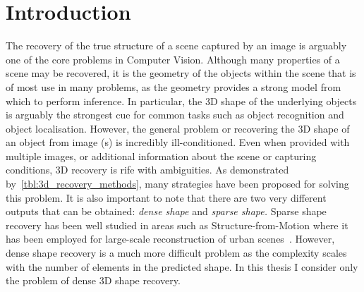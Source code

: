 \chapter{Introduction}\label{ch:intro}
The recovery of the true structure of a scene captured by an image is 
arguably one of the core problems in Computer Vision. Although many properties
of a scene may be recovered, it is the geometry of the objects within the scene
that is of most use in many problems, as the geometry provides a strong model
from which to perform inference. In particular, the 3D shape of the underlying
objects is arguably the strongest cue for common tasks such as object
recognition and object localisation. However, the general problem or recovering
the 3D shape of an object from image (s) is incredibly ill-conditioned. Even when 
provided with multiple images, or additional information about the scene or
capturing conditions, 3D recovery is rife with ambiguities. As demonstrated
by~\cref{tbl:3d_recovery_methods}, many strategies have been proposed for
solving this problem. It is also important to note that there are two very
different outputs that can be obtained: \textit{dense shape} and 
\textit{sparse shape.} Sparse shape recovery has been
well studied in areas such as Structure-from-Motion where it has been
employed for large-scale reconstruction of urban scenes~\cite{agarwal2009building,torr1998robust}.
However, dense shape recovery is a much more difficult problem as the
complexity scales with the number of elements in the predicted
shape. In this thesis I consider only the problem of dense 3D shape recovery.

